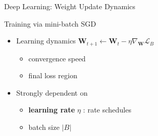 \begin{frame}{Deep Learning: Weight Update Dynamics}
\protect\hypertarget{deep-learning-weight-update-dynamics-2}{}
\begin{block}{Training via mini-batch SGD}
\protect\hypertarget{training-via-mini-batch-sgd-4}{}
\begin{itemize}
\tightlist
\item
  Learning dynamics
  \(\mathbf{W}_{t+1} \leftarrow \mathbf{W}_t - \eta \nabla_\mathbf{W} \mathcal{L}_B\)

  \begin{itemize}
  \tightlist
  \item
    convergence speed
  \item
    final loss region
  \end{itemize}
\item
  Strongly dependent on

  \begin{itemize}
  \tightlist
  \item
    \textbf{learning rate} \(\eta\) : rate schedules
  \item
    batch size \(\vert B \vert\)
  \end{itemize}
\end{itemize}
\end{block}

\end{frame}

